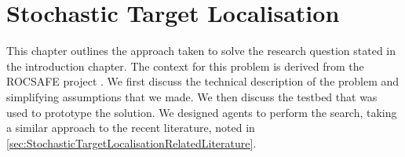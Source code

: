 
\chapter{Stochastic Target Localisation}\label{chap:targetLocalisation}
This chapter outlines the approach taken to solve the research question stated in the introduction chapter. The context for this problem is derived from the ROCSAFE project \cite{Bagherzadeh2017ROCSAFE:Incidents}. We first discuss the technical description of the problem and simplifying assumptions that we made. We then discuss the testbed that was used to prototype the solution. We designed agents to perform the search, taking a similar approach to the recent literature, noted in \ref{sec:StochasticTargetLocalisationRelatedLiterature}.











\label{sec:SimulationResults}

